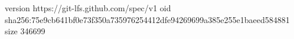 version https://git-lfs.github.com/spec/v1
oid sha256:75e9cb641bf0e73f350a735976254412dfe94269699a385e255e1baeed584881
size 346699
